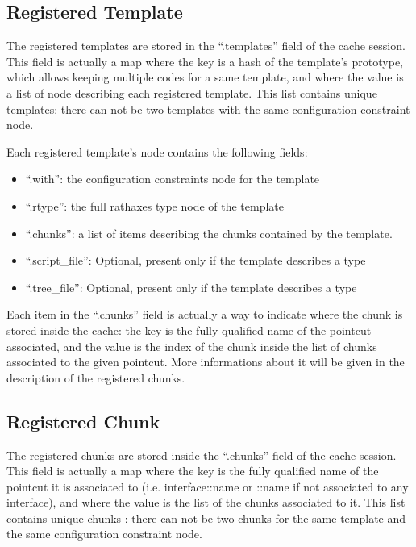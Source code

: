 \documentclass[american]{rtxreport}
\begin{document}
\begin{enumerate}
\subsection{Registered Template}

The registered templates are stored in the ``.templates'' field of the cache
session. This field is actually a map where the key is a hash of the template's
prototype, which allows keeping multiple codes for a same template, and where
the value is a list of node describing each registered template. This list
contains unique templates: there can not be two templates with the same
configuration constraint node.

Each registered template's node contains the following fields:
\begin{itemize}
    \item ``.with'': the configuration constraints node for the template
    \item ``.rtype'': the full rathaxes type node of the template
    \item ``.chunks'': a list of items describing the chunks contained by the
            template.
    \item ``.script\_file'': Optional, present only if the template describes
            a type
    \item ``.tree\_file'': Optional, present only if the template describes
            a type
\end{itemize}

Each item in the ``.chunks'' field is actually a way to indicate where the
chunk is stored inside the cache: the key is the fully qualified name of the
pointcut associated, and the value is the index of the chunk inside the list of
chunks associated to the given pointcut. More informations about it will be
given in the description of the registered chunks.


\subsection{Registered Chunk}

The registered chunks are stored inside the ``.chunks'' field of the cache
session. This field is actually a map where the key is the fully qualified name
of the pointcut it is associated to (i.e. interface::name or ::name if not
associated to any interface), and where the value is the list of the chunks
associated to it. This list contains unique chunks : there can not be two
chunks for the same template and the same configuration constraint node.


\end{enumerate}
\end{document}
